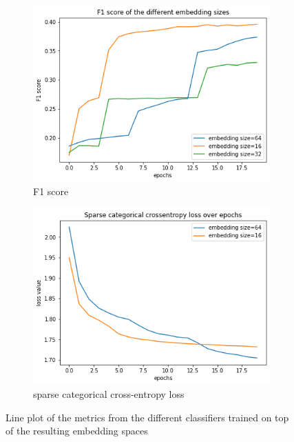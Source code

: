 \begin{figure}[t]
\captionsetup{format=plain}
\centering
\begin{subfigure}{.5\linewidth}
  \centering
  \includegraphics[width=.9\linewidth]{study-doc/experiment_embedding_size/assets/classifier_f1.png}
  \caption{F1 score}
  \label{fig:embedding-size-classifier-f1}
\end{subfigure}%
\begin{subfigure}{.5\linewidth}
  \centering
  \includegraphics[width=.9\linewidth]{study-doc/experiment_embedding_size/assets/classifier_loss.png}
  \caption{sparse categorical cross-entropy loss}
  \label{fig:embedding-size-classifier-loss}
\end{subfigure}
\caption{Line plot of the metrics from the different classifiers trained on top of the resulting embedding spaces}
\label{fig:embedding-size-experiment-classifier-metrics}
\end{figure}
